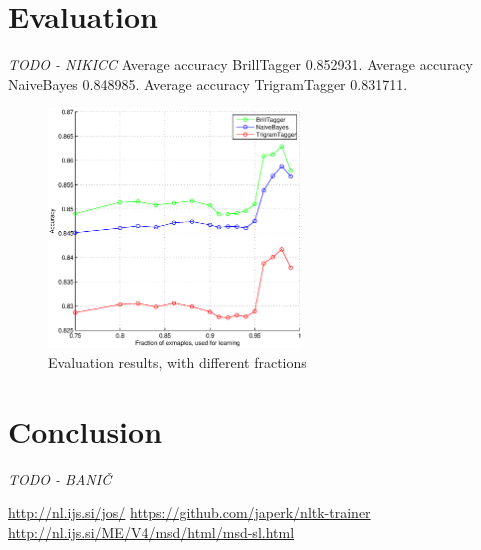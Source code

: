\documentclass[11pt,a4paper,english,twocolumn]{article}
\begin{document}
\section{Evaluation}\label{Evaluation}
\textit{TODO - NIKICC}
Average accuracy BrillTagger 0.852931.
Average accuracy NaiveBayes 0.848985.
Average accuracy TrigramTagger 0.831711.

\begin{figure}[h]
\begin{center}
\leavevmode
\includegraphics[width=0.6\textwidth]{../evaluation/graph.eps} 
\end{center}
\caption{Evaluation results, with different fractions}
\label{fig:evaluation}
\end{figure}

\section{Conclusion}
\textit{TODO - BANIČ}

\begin{thebibliography}{99}
 \url{http://nl.ijs.si/jos/}
 \url{https://github.com/japerk/nltk-trainer}
 \url{http://nl.ijs.si/ME/V4/msd/html/msd-sl.html}
\end{thebibliography}
\end{document}
